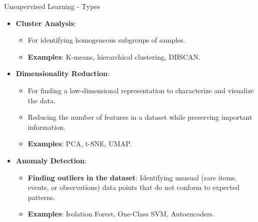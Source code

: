 \begin{frame}[allowframebreaks]{Unsupervised Learning - Types}
    \begin{itemize}
        \item \textbf{Cluster Analysis}: 
        \begin{itemize}
            \item For identifying homogeneous subgroups of samples.
            \item \textbf{Examples}: K-means, hierarchical clustering, DBSCAN.
        \end{itemize}    
        \item \textbf{Dimensionality Reduction}:
        \begin{itemize}
            \item For finding a low-dimensional representation to characterize and visualize the data.
            \item Reducing the number of features in a dataset while preserving important information.
            \item \textbf{Examples}: PCA, t-SNE, UMAP.
        \end{itemize}
        \item \textbf{Anomaly Detection}: 
        \begin{itemize}
            \item \textbf{Finding outliers in the dataset}: Identifying unusual (rare items, events, or observations) data points that do not conform to expected patterns.
            \item \textbf{Examples}: Isolation Forest, One-Class SVM, Autoencoders.
        \end{itemize}
    \end{itemize}
\end{frame}


